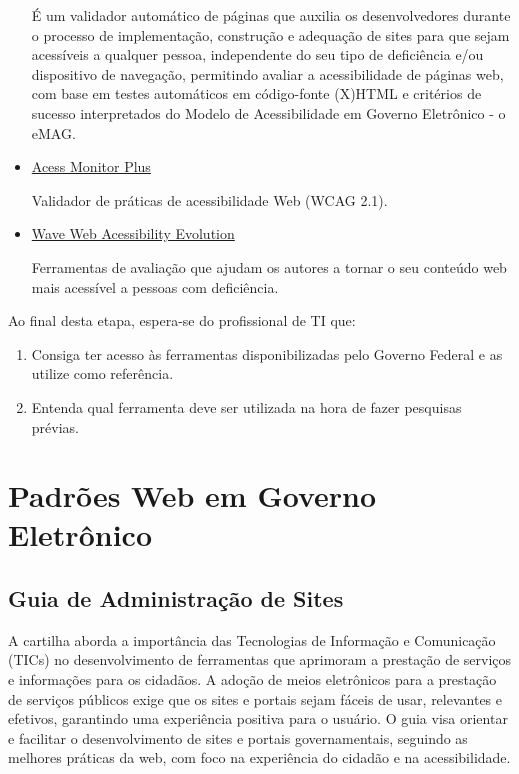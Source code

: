 \documentclass[
  12pt,
  openright,
  twoside,
  a4paper,
  english,
  french,
  spanish,
  brazil
]{abntex2}
\begin{document}
\begin{itemize}
    É um validador automático de páginas que auxilia os desenvolvedores durante
    o processo de implementação, construção e adequação de sites para que sejam
    acessíveis a qualquer pessoa, independente do seu tipo de deficiência e/ou
    dispositivo de navegação, permitindo avaliar a acessibilidade de páginas
    web, com base em testes automáticos em código-fonte (X)HTML e critérios de
    sucesso interpretados do Modelo de Acessibilidade em Governo Eletrônico - o
    eMAG.

  \item
    \href{https://accessmonitor.acessibilidade.gov.pt}{Acess Monitor Plus}

    Validador de práticas de acessibilidade Web (WCAG 2.1).

  \item
    \href{https://wave.webaim.org/}{Wave Web Acessibility Evolution}

    Ferramentas de avaliação que ajudam os autores a tornar o seu conteúdo web
    mais acessível a pessoas com deficiência.
\end{itemize}

Ao final desta etapa, espera-se do profissional de TI que:

\begin{enumerate}
  \item
    Consiga ter acesso às ferramentas disponibilizadas pelo Governo Federal e as
    utilize como referência.
  \item
    Entenda qual ferramenta deve ser utilizada na hora de fazer pesquisas
    prévias.
\end{enumerate}

\chapter{Padrões Web em Governo Eletrônico}

\section{Guia de Administração de Sites}

A cartilha aborda a importância das Tecnologias de Informação e Comunicação
(TICs) no desenvolvimento de ferramentas que aprimoram a prestação de serviços e
informações para os cidadãos. A adoção de meios eletrônicos para a prestação de
serviços públicos exige que os sites e portais sejam fáceis de usar, relevantes
e efetivos, garantindo uma experiência positiva para o usuário. O guia visa
orientar e facilitar o desenvolvimento de sites e portais governamentais,
seguindo as melhores práticas da web, com foco na experiência do cidadão e na
acessibilidade.
\end{document}

